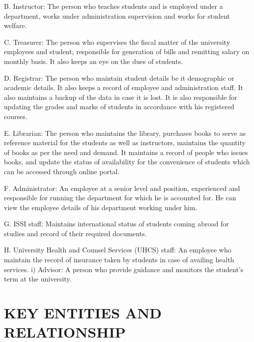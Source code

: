 \documentclass[12pt,letterpaper]{article}
\begin{document}
 
 B. Instructor: The person who teaches students and is employed under a department, works under administration supervision and works for student welfare.
 
 C. Treasurer: The person who supervises the fiscal matter of the university employees and student, responsible for generation of bills and remitting salary on monthly basis. It also keeps an eye on the dues of students.
  
  D. Registrar: The person who maintain student details be it demographic or academic details. It also keeps a record of employee and administration staff. It also maintains a backup of the data in case it is lost. It is also responsible for updating the grades and marks of students in accordance with his registered courses.
   
   E. Librarian: The person who maintains the library, purchases books to serve as reference material for the students as well as instructors, maintains the quantity of books as per the need and demand. It maintains a record of people who issues books, and update the status of availability for the convenience of students which can be accessed through online portal.
    
   
    
 F.  Administrator: An employee at a senior level and position, experienced and responsible for running the department for which he is accounted for. He can view the employee details of his department working under him. 
     
     G. ISSI staff: Maintains international status of students coming abroad for studies and record of their required documents.
     
  H.  University Health and Counsel Services (UHCS) staff: An employee who maintain the record of insurance taken by students in case of availing health services. i) Advisor: A person who provide guidance and monitors the student’s term at the university. 







\section{KEY ENTITIES AND RELATIONSHIP}
\end{document}
